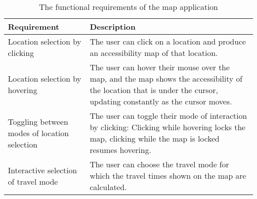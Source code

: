 \begin{table}[H]
	\caption{The functional requirements of the map application}
	\label{tab:functional requirements}
	\centering
	\begin{tabular}{ | L{0.3\textwidth} | L{0.6\textwidth} | }
		\hline
		Requirement
		& Description
		\\
		\hline
		\hline
		Location selection by clicking
		& The user can click on a location and produce an accessibility map of that location.
		\\
		\hline
		Location selection by hovering
		& The user can hover their mouse over the map,
		and the map shows the accessibility of the location that is under the cursor,
		updating constantly as the cursor moves.
		\\
		\hline
		Toggling between modes of location selection
		& The user can toggle their mode of interaction by clicking:
		Clicking while hovering locks the map, clicking while the map is locked resumes hovering.
		\\
		\hline
		Interactive selection of travel mode
		& The user can choose the travel mode for which the travel times shown on the map are calculated.
		\\
		\hline
	\end{tabular}
\end{table}
